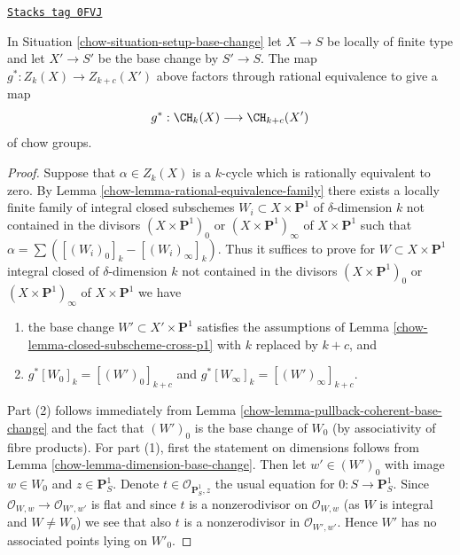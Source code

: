 \begin{lemma}
\label{chow-lemma-pullback-base-change}
\href{https://stacks.math.columbia.edu/tag/0FVJ}{\texttt{Stacks tag 0FVJ}}

In Situation \ref{chow-situation-setup-base-change} let $X \to S$ be locally
of finite type and let $X' \to S'$ be the base change by $S' \to S$.
The map $g^* : Z_k(X) \to Z_{k + c}(X')$ above factors through rational
equivalence to give a map
$$
g^* : \CH_k(X) \longrightarrow \CH_{k + c}(X')
$$
of chow groups.
\end{lemma}

\begin{proof}

Suppose that $\alpha \in Z_k(X)$ is a $k$-cycle which is rationally equivalent
to zero. By Lemma \ref{chow-lemma-rational-equivalence-family}
there exists a locally finite family of integral closed subschemes
$W_i \subset X \times \mathbf{P}^1$ of $\delta$-dimension $k$
not contained in the divisors
$(X \times \mathbf{P}^1)_0$ or $(X \times \mathbf{P}^1)_\infty$
of $X \times \mathbf{P}^1$ such that
$\alpha = \sum ([(W_i)_0]_k - [(W_i)_\infty]_k)$.
Thus it suffices to prove for $W \subset X \times \mathbf{P}^1$
integral closed of $\delta$-dimension $k$ not contained in the divisors
$(X \times \mathbf{P}^1)_0$ or $(X \times \mathbf{P}^1)_\infty$
of $X \times \mathbf{P}^1$ we have
\begin{enumerate}
\item the base change $W' \subset X' \times \mathbf{P}^1$ satisfies the
assumptions of Lemma \ref{chow-lemma-closed-subscheme-cross-p1} with
$k$ replaced by $k + c$, and
\item $g^*[W_0]_k = [(W')_0]_{k + c}$ and
$g^*[W_\infty]_k = [(W')_\infty]_{k + c}$.
\end{enumerate}
Part (2) follows immediately from
Lemma \ref{chow-lemma-pullback-coherent-base-change} and the fact that
$(W')_0$ is the base change of $W_0$ (by associativity of fibre products).
For part (1), first the statement on dimensions follows
from Lemma \ref{chow-lemma-dimension-base-change}.
Then let $w' \in (W')_0$ with image $w \in W_0$
and $z \in \mathbf{P}^1_S$. Denote $t \in \mathcal{O}_{\mathbf{P}^1_S, z}$
the usual equation for $0 : S \to \mathbf{P}^1_S$.
Since $\mathcal{O}_{W, w} \to \mathcal{O}_{W', w'}$ is flat
and since $t$ is a nonzerodivisor on $\mathcal{O}_{W, w}$
(as $W$ is integral and $W \not = W_0$) we see that also
$t$ is a nonzerodivisor in $\mathcal{O}_{W', w'}$. Hence
$W'$ has no associated points lying on $W'_0$.
\end{proof}

